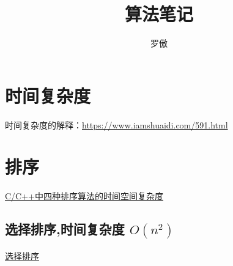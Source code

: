 \documentclass[12pt,a4paper,onecolumn]{article}
\author{罗傲}
\title{算法笔记}
\begin{document}
	\maketitle
	\section{时间复杂度}
	时间复杂度的解释：\hyperref{https://www.iamshuaidi.com/591.html}{category}{name}{https://www.iamshuaidi.com/591.html}
	\section{排序}
	\hyperref{https://blog.csdn.net/struggle_kid/article/details/107933623}{category}{name}{C/C++中四种排序算法的时间空间复杂度}
	\subsection{选择排序,时间复杂度 $O(n^2)$}
	\hyperref{https://github.com/la1993628/Algorithm_study/blob/master/%
\end{document}
